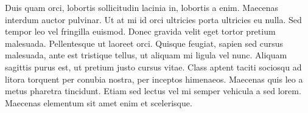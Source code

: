 \documentclass[a4paper,10pt]{book}
\begin{document}
Duis quam orci, lobortis sollicitudin lacinia in, lobortis a enim. Maecenas interdum auctor pulvinar.
Ut at mi id orci ultricies porta ultricies eu nulla. Sed tempor leo vel fringilla euismod. Donec gravida velit
eget tortor pretium malesuada. Pellentesque ut laoreet orci. Quisque feugiat, sapien sed cursus malesuada,
ante est tristique tellus, ut aliquam mi ligula vel nunc. Aliquam sagittis purus est, ut pretium justo cursus vitae.
Class aptent taciti sociosqu ad litora torquent per conubia nostra, per inceptos himenaeos.
Maecenas quis leo a metus pharetra tincidunt. Etiam sed lectus vel mi semper vehicula a sed lorem.
Maecenas elementum sit amet enim et scelerisque.
\end{document}
